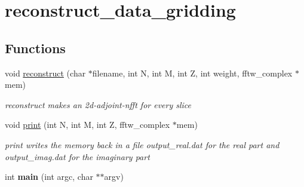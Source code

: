 \hypertarget{group__applications__mri3d__reconstruct__data__gridding}{
\section{reconstruct\_\-data\_\-gridding}
\label{group__applications__mri3d__reconstruct__data__gridding}
}
\subsection*{Functions}
\begin{CompactItemize}
\item 
\hypertarget{group__applications__mri3d__reconstruct__data__gridding_ga0}{
void \hyperlink{group__applications__mri3d__reconstruct__data__gridding_ga0}{reconstruct} (char $\ast$filename, int N, int M, int Z, int weight, fftw\_\-complex $\ast$mem)}
\label{group__applications__mri3d__reconstruct__data__gridding_ga0}

\begin{CompactList}\small\item\em reconstruct makes an 2d-adjoint-nfft for every slice \item\end{CompactList}\item 
\hypertarget{group__applications__mri3d__reconstruct__data__gridding_ga1}{
void \hyperlink{group__applications__mri3d__reconstruct__data__gridding_ga1}{print} (int N, int M, int Z, fftw\_\-complex $\ast$mem)}
\label{group__applications__mri3d__reconstruct__data__gridding_ga1}

\begin{CompactList}\small\item\em print writes the memory back in a file output\_\-real.dat for the real part and output\_\-imag.dat for the imaginary part \item\end{CompactList}\item 
\hypertarget{group__applications__mri3d__reconstruct__data__gridding_ga2}{
int {\bf main} (int argc, char $\ast$$\ast$argv)}
\label{group__applications__mri3d__reconstruct__data__gridding_ga2}

\end{CompactItemize}
